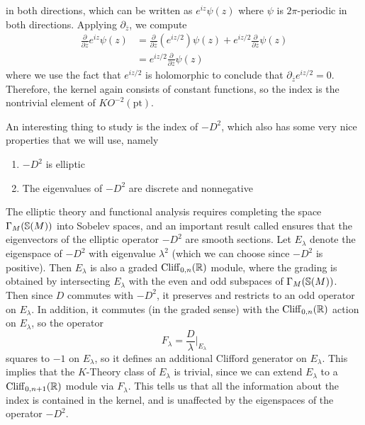 \begin{exmp}
\begin{enumerate}
  in both directions, which can be written as $e^{iz}\psi(z)$ where $\psi$ is
  $2\pi$-periodic in both directions. Applying $\partial_{\overline{z}}$, we compute
  \begin{align*}
  \frac{\partial}{\partial\overline{z}}e^{iz}\psi(z)
  &= \frac{\partial}{\partial\overline{z}}(e^{iz/2})\psi(z)
  + e^{iz/2}\frac{\partial}{\partial\overline{z}}\psi(z) \\[5pt]
  &= e^{iz/2}\frac{\partial}{\partial\overline{z}}\psi(z)
  \end{align*}
  where we use the fact that $e^{iz/2}$ is holomorphic to conclude that
  $\partial_{\overline{z}}e^{iz/2} = 0$. Therefore, the kernel again consists
  of constant functions, so the index is the nontrivial element of
  $KO^{-2}(\mathrm{pt})$.
\end{enumerate}
\end{exmp}

An interesting thing to study is the index of $-D^2$, which also has some very nice
properties that we will use, namely
\begin{enumerate}
  \item $-D^2$ is elliptic
  \item The eigenvalues of $-D^2$ are discrete and nonnegative
\end{enumerate}
%
The elliptic theory and functional analysis requires completing the space
$\Gamma_M(\S(M))$ into Sobelev spaces, and an important result called  ensures that the eigenvectors of the elliptic operator $-D^2$ are smooth
sections. Let $E_\lambda$ denote the eigenspace of $-D^2$ with eigenvalue $\lambda^2$
(which we can choose since $-D^2$ is positive). Then $E_\lambda$ is also a graded
$\Cliff_{0,n}(\R)$ module, where the grading is obtained by intersecting $E_\lambda$
with the even and odd subspaces of $\Gamma_M(\S(M))$. Then since $D$ commutes with
$-D^2$, it preserves and restricts to an odd operator on $E_\lambda$. In addition,
it commutes (in the graded sense) with the $\Cliff_{0,n}(\R)$ action on $E_\lambda$,
so the operator
\[
F_\lambda = \frac{D}{\lambda}\bigg\vert_{E_\lambda}
\]
squares to $-1$ on $E_\lambda$, so it defines an additional Clifford generator on
$E_\lambda$. This implies that the $K$-Theory class of $E_\lambda$ is trivial, since
we can extend $E_\lambda$ to a $\Cliff_{0, n+1}(\R)$ module via $F_\lambda$. This
tells us that all the information about the index is contained in the kernel, and is
unaffected by the eigenspaces of the operator $-D^2$.
%